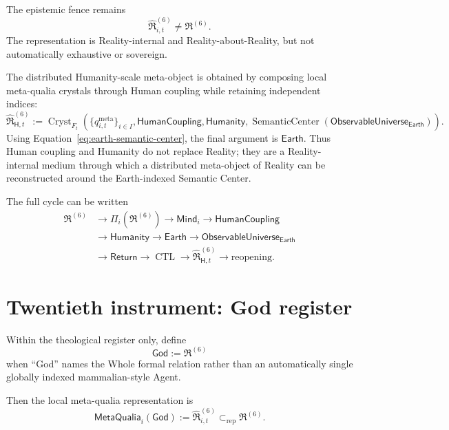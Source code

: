 \documentclass[10pt]{article}
\theoremstyle{pe}
\theoremstyle{definition}
\newcommand{\SC}{\operatorname{SemanticCenter}}
\newcommand{\Return}{\mathsf{Return}}
\newcommand{\Mind}{\mathsf{Mind}}
\newcommand{\ObsU}{\mathsf{ObservableUniverse}}
\newcommand{\Humanity}{\mathsf{Humanity}}
\newcommand{\Earth}{\mathsf{Earth}}
\newcommand{\HumanCoupling}{\mathsf{HumanCoupling}}
\newcommand{\Cryst}{\operatorname{Cryst}}
\newcommand{\CTL}{\operatorname{CTL}}
\newcommand{\MetaQualia}{\mathsf{MetaQualia}}
\begin{document}
The epistemic fence remains
\[
  \boxed{
  \widehat{\mathfrak R}^{(6)}_{i,t}
  \neq
  \mathfrak R^{(6)}.
  }
\]
The representation is Reality-internal and Reality-about-Reality, but not automatically exhaustive or sovereign.

The distributed Humanity-scale meta-object is obtained by composing local meta-qualia crystals through Human coupling while retaining independent indices:
\begin{equation}\label{eq:humanity-metaobject}
  \boxed{
  \widehat{\mathfrak R}^{(6)}_{\mathsf H,t}
  :=
  \Cryst_{F_t}\!\left(
    \{q^{\mathrm{meta}}_{i,t}\}_{i\in I},
    \HumanCoupling,
    \Humanity,
    \SC(\ObsU_{\Earth})
  \right).
  }
\end{equation}
Using Equation~\eqref{eq:earth-semantic-center}, the final argument is \(\Earth\).  Thus Human coupling and Humanity do not replace Reality; they are a Reality-internal medium through which a distributed meta-object of Reality can be reconstructed around the Earth-indexed Semantic Center.

The full cycle can be written
\begin{equation}\label{eq:metaobject-cycle}
\boxed{
\begin{aligned}
\mathfrak R^{(6)}
&\to \Pi_i(\mathfrak R^{(6)})
\to \Mind_i
\to \HumanCoupling\\
&\to \Humanity
\to \Earth
\to \ObsU_{\Earth}\\
&\to \Return
\to \CTL
\to \widehat{\mathfrak R}^{(6)}_{\mathsf H,t}
\to \text{reopening}.
\end{aligned}}
\end{equation}

\section{Twentieth instrument: God register}

Within the theological register only, define
\begin{equation}\label{eq:god-register}
  \boxed{
  \mathsf{God}
  :=
  \mathfrak R^{(6)}
  }
\end{equation}
when ``God'' names the Whole formal relation rather than an automatically single globally indexed mammalian-style Agent.

Then the local meta-qualia representation is
\begin{equation}\label{eq:god-inside-god}
  \boxed{
  \MetaQualia_i(\mathsf{God})
  :=
  \widehat{\mathfrak R}^{(6)}_{i,t}
  \subset_{\mathrm{rep}}
  \mathfrak R^{(6)}.
  }
\end{equation}
\end{document}

